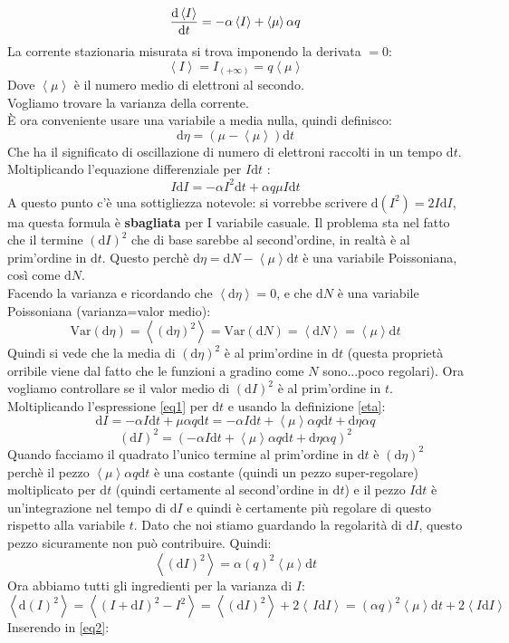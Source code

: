 \documentclass[a4paper,12pt]{article}
\renewcommand{\arg}[1]{_{(#1)}}
\theoremstyle{plain}
\theoremstyle{definition}
\newcommand{\ave}[1]{\left\langle#1\right\rangle }
\newcommand{\Var}{\mathrm{Var}}
\renewcommand{\d}{\text{d}}
\theoremstyle{remark}
\begin{document}
\[\dv{\ave{I}}{t}=-\alpha \ave{I}	+\ave{\mu}	\alpha q\]
La corrente stazionaria misurata si trova imponendo la derivata $=0$:
	\[\ave{I}=I\arg{+\infty}=q\ave{\mu}	\]
	Dove $\ave{\mu}$ è il numero medio di elettroni al secondo.\\
	Vogliamo trovare la varianza della corrente.\\
È ora conveniente usare una variabile a media nulla, quindi definisco:
\begin{equation}
	\d \eta=\left(\mu-\ave{\mu}	\right) \d t
	\label{eta}
\end{equation}
Che ha il significato di oscillazione di numero di elettroni raccolti in un tempo $\d t$.
Moltiplicando l'equazione differenziale per $I \d t$ :
\begin{equation}
I \d I=-\alpha {I^2} \d t+\alpha q {\mu I}\d t	\label{eq2}
\end{equation}
A questo punto c'è una sottigliezza notevole: si vorrebbe scrivere $\d (I^2)= 2 I\d I$, ma questa formula è \textbf{sbagliata} per I variabile casuale. Il problema sta nel fatto che il termine $(\d I)^2$ che di base sarebbe al second'ordine, in realtà è al prim'ordine in $\d t$. Questo perchè $\d \eta=\d N-\ave{\mu} \d t$ è una variabile Poissoniana, così come $\d N$.\\
Facendo la varianza e ricordando che $\ave{\d \eta}=0$, e che $\d N$ è una variabile Poissoniana (varianza=valor medio):
\[\Var{(\d \eta)}=\ave{(\d \eta)^2}=\Var(\d N)=\ave{\d N}=\ave{\mu}	\d t	\] 
Quindi si vede che la media di $(\d \eta)^2$ è al prim'ordine in $\d t$ (questa proprietà orribile viene dal fatto che le funzioni a gradino come $N$ sono...poco regolari).
Ora vogliamo controllare se il valor medio di $(\d I)^2$ è al prim'ordine in $t$. Moltiplicando l'espressione \ref{eq1} per $\d t$ e usando la definizione \ref{eta}:
\[{\d I}=-\alpha I	\d t+\mu \alpha q \d t=-\alpha I	\d t+\ave{\mu} \alpha q \d t	+\d \eta \alpha q 
\]
\[({\d I})^2=(-\alpha I	\d t+\ave{\mu} \alpha q \d t+\d \eta \alpha q)^2	\]
Quando facciamo il quadrato l'unico termine al prim'ordine in $\d t$ è $(\d \eta)^2$ perchè il pezzo $\ave{\mu} \alpha q \d t$ è una costante (quindi un pezzo super-regolare) moltiplicato per $\d t$ (quindi certamente al second'ordine in $\d t$) e il pezzo $I\d t$ è un'integrazione nel tempo di $\d I$ e quindi è certamente più regolare di questo rispetto alla variabile $t$. Dato che noi stiamo guardando la regolarità di $\d I$, questo pezzo sicuramente non può contribuire.
Quindi:
\[\ave{(\d I)^2}=\alpha\left(	 q\right)^2	\ave{\mu} \d t	\]
Ora abbiamo tutti gli ingredienti per la varianza di $I$:
\[\ave{\d(I)^2}=\ave{\left(I+\d I\right)^2 -I^2}=\ave{(\d I)^2}+2\ave{\,I \d I	}=\left(	\alpha q\right)^2	\ave{\mu} \d t+2\ave{I \d I}	\]
Inserendo in \ref{eq2}:
\end{document}
